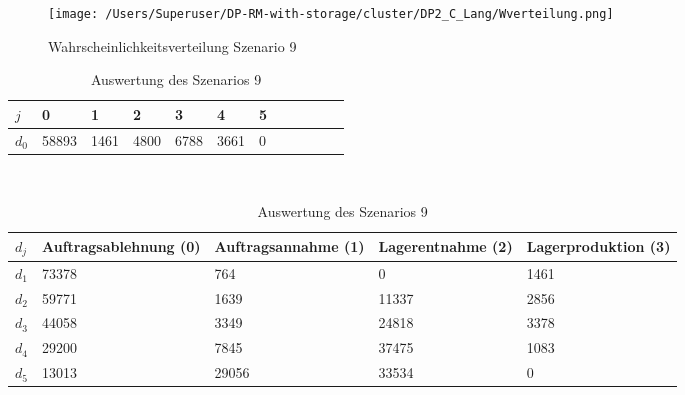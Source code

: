 \begin{figure}[h!]
  \begin{center}
    \texttt{[image: /Users/Superuser/DP-RM-with-storage/cluster/DP2\_C\_Lang/Wverteilung.png]}
    \caption{Wahrscheinlichkeitsverteilung Szenario 9}  \label{SB9}
  \end{center}
\end{figure}

\begin{table}[h!]
\renewcommand{\arraystretch}{1.5}
  \begin{center}
    \caption{Auswertung des Szenarios 9}  \label{AS9}
    \vspace*{3mm}
    \begin{tabular}{l l l l l l l l l l l l }  \hline 
         $j$ & 0 & 1  & 2 & 3 & 4  & 5   \\  \hline
$d_{0}$ &  58893 &  1461 &  4800 &  6788 &  3661 &  0 \\ \hline
    \end{tabular} \\[3mm]
        \begin{tabular}{ l p{2.5cm} p{2.5cm} p{2.5cm} p{2.5cm} }   \hline    %
    $d_j$ & Auftrags\-ablehnung (0) & Auftrags\-annahme (1)  & Lager\-entnahme (2) & Lager\-produktion (3)\\\hline 
$d_1$ &  73378 &    764 &    0 &  1461 \\
$d_2$ &  59771 &   1639 &  11337 &  2856 \\
$d_3$ &  44058 &   3349 &  24818 &  3378 \\
$d_4$ &  29200 &   7845 &  37475 &  1083 \\
$d_5$ &  13013 &  29056 &  33534 &   0 \\
          \hline
   \end{tabular} \\[3mm]
     \end{center}
\end{table}





